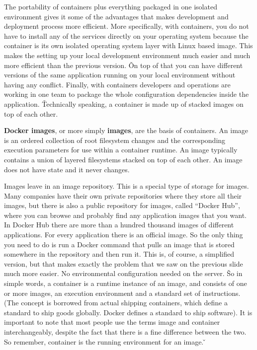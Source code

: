 The portability of containers plus everything packaged in one isolated environment gives it some of the advantages
that makes development and deployment process more efficient. More specifically, with containers, you do not have to
install any of the services directly on your operating system because the container is its own isolated operating
system layer with Linux based image. This makes the setting up your local development environment much easier and
much more efficient than the previous version. \v

On top of that you can have different versions of the same application running on your local environment without
having any conflict. Finally, with containers developers and operations are working in one team to package the whole
configuration dependencies inside the application. \v

Technically speaking, a container is made up of stacked images on top of each other.

\textbf{Docker images}, or more simply \textbf{images}, are the basis of containers. An image is an ordered
collection of root filesystem changes and the corresponding execution parameters for use within a container runtime.
An image typically contains a union of layered filesystems stacked on top of each other. An image does not have state
and it never changes.
\ed

Images leave in an image repository. This is a special type of storage for images. Many companies have their own
private repositories where they store all their images, but there is also a public repository for images, called
``Docker Hub'', where you can browse and probably find any application images that you want. In Docker Hub there are
more than a hundred thousand images of different applications. For every application there is an official image. So
the only thing you need to do is run a Docker command that pulls an image that is stored somewhere in the repository
and then run it. This is, of course, a simplified version, but that makes exactly the problem that we saw on the
previous slide much more easier. No environmental configuration needed on the server. \v

So in simple words, a container is a runtime instance of an image, and consists of one or more images, an execution
environment and a standard set of instructions. (The concept is borrowed from actual shipping containers, which
define a standard to ship goods globally. Docker defines a standard to ship software). It is important to note that
most people use the terms image and container interchangeably, despite the fact that there is a fine difference
between the two. So remember, container is the running environment for an image. \v

